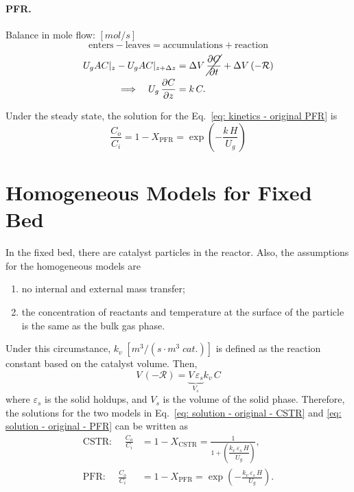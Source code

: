 \paragraph{PFR. }
Balance in mole flow:
$[\si{mol/s}]$
\begin{equation*}
    \text{enters} - \text{leaves}
    = \text{accumulations} + \text{reaction}
\end{equation*}
\begin{align}
    U_g A C|_z - U_g A C|_{z+\Delta z}
     & = \Delta V \, \cancel{\frac{\partial C}{\partial t}} 
       + \Delta V \,(\mathcal{-R})\\
    \Longrightarrow \quad
    U_g \, \frac{\partial C}{\partial z}
     & = k\,C.
    \label{eq: kinetics - original PFR}
\end{align}

Under the steady state, the solution for the Eq.~\eqref{eq: kinetics - original PFR} is 
\begin{equation}
    \frac{C_o}{C_i} = 1-X_\text{PFR} 
    = \exp{\left( -\frac{k\, H}{U_g} \right)}
    \label{eq: solution - original - PFR}
\end{equation}

\section{Homogeneous Models for Fixed Bed}
In the fixed bed, there are catalyst particles in the reactor.  
Also, the assumptions for the homogeneous models are 
\begin{enumerate}
    \item no internal and external mass transfer;
    \item the concentration of reactants and temperature at the surface of the particle is the same as the bulk gas phase.
\end{enumerate}
Under this circumstance, $k_v\; [\si{m^3/(s\cdot m^3\;cat.)}]$ is defined as the reaction constant based on the catalyst volume. 
Then, 
\begin{equation}
    V \,(\mathcal{-R}) 
    = \underbrace{V \, \varepsilon_s}_{V_s} k_v\,C
\end{equation}
where $\varepsilon_s$ is the solid holdups, 
and $V_s$ is the volume of the solid phase. 
Therefore, the solutions for the two models in Eq.~\eqref{eq: solution - original - CSTR} and \eqref{eq: solution - original - PFR} can be written as 
\begin{align}
    \text{CSTR: }\quad
    \frac{C_o}{C_i} &= 1-X_\text{CSTR} 
    = \frac{1}
    {1+\left(\dfrac{k_v\, \varepsilon_s \, H}{U_g}\right)},
    \\
    \text{PFR: }\quad
    \frac{C_o}{C_i} &= 1-X_\text{PFR} 
    = \exp{\left( -\frac{k_v\, \varepsilon_s \, H}{U_g} \right)}.
\end{align}

